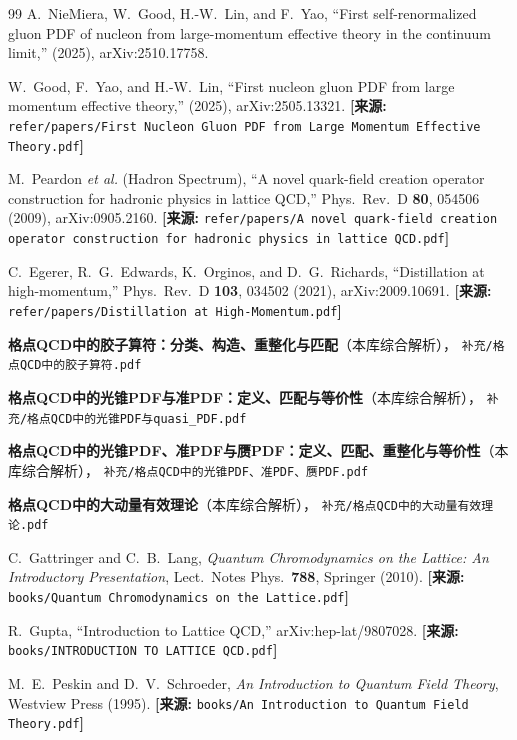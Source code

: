 \documentclass[12pt,a4paper]{ctexart}
\theoremstyle{definition}
\begin{document}
\begin{thebibliography}{99}
A.~NieMiera, W.~Good, H.-W.~Lin, and F.~Yao,
``First self-renormalized gluon PDF of nucleon from large-momentum effective theory in the continuum limit,''
(2025), arXiv:2510.17758.

W.~Good, F.~Yao, and H.-W.~Lin,
``First nucleon gluon PDF from large momentum effective theory,''
(2025), arXiv:2505.13321.
\quad\textbf{[来源:} \texttt{refer/papers/First Nucleon Gluon PDF from Large Momentum Effective Theory.pdf}\textbf{]}

M.~Peardon \textit{et al.} (Hadron Spectrum),
``A novel quark-field creation operator construction for hadronic physics in lattice QCD,''
Phys.\ Rev.\ D \textbf{80}, 054506 (2009), arXiv:0905.2160.
\quad\textbf{[来源:} \texttt{refer/papers/A novel quark-field creation operator construction for hadronic physics in lattice QCD.pdf}\textbf{]}

C.~Egerer, R.~G.~Edwards, K.~Orginos, and D.~G.~Richards,
``Distillation at high-momentum,''
Phys.\ Rev.\ D \textbf{103}, 034502 (2021), arXiv:2009.10691.
\quad\textbf{[来源:} \texttt{refer/papers/Distillation at High-Momentum.pdf}\textbf{]}

\textbf{格点QCD中的胶子算符：分类、构造、重整化与匹配}（本库综合解析），
\texttt{补充/格点QCD中的胶子算符.pdf}

\textbf{格点QCD中的光锥PDF与准PDF：定义、匹配与等价性}（本库综合解析），
\texttt{补充/格点QCD中的光锥PDF与quasi\_PDF.pdf}

\textbf{格点QCD中的光锥PDF、准PDF与赝PDF：定义、匹配、重整化与等价性}（本库综合解析），
\texttt{补充/格点QCD中的光锥PDF、准PDF、赝PDF.pdf}

\textbf{格点QCD中的大动量有效理论}（本库综合解析），
\texttt{补充/格点QCD中的大动量有效理论.pdf}

C.~Gattringer and C.~B.~Lang,
\textit{Quantum Chromodynamics on the Lattice: An Introductory Presentation},
Lect.\ Notes Phys.\ \textbf{788}, Springer (2010).
\quad\textbf{[来源:} \texttt{books/Quantum Chromodynamics on the Lattice.pdf}\textbf{]}

R.~Gupta,
``Introduction to Lattice QCD,''
arXiv:hep-lat/9807028.
\quad\textbf{[来源:} \texttt{books/INTRODUCTION TO LATTICE QCD.pdf}\textbf{]}

M.~E.~Peskin and D.~V.~Schroeder,
\textit{An Introduction to Quantum Field Theory},
Westview Press (1995).
\quad\textbf{[来源:} \texttt{books/An Introduction to Quantum Field Theory.pdf}\textbf{]}

\end{thebibliography}
\end{document}
